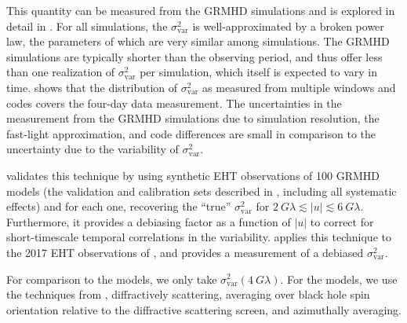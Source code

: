 This quantity can be measured from the GRMHD simulations and is explored in detail in \citealt{Georgiev_2022}. For all simulations, the $\sigma_\text{var}^2$ is well-approximated by a broken power law, the parameters of which are very similar among simulations. The GRMHD simulations are typically shorter than the observing period, and thus offer less than one realization of $\sigma_\text{var}^2$ per simulation, which itself is expected to vary in time. \citealt{Georgiev_2022} shows that the distribution of $\sigma_\text{var}^2$ as measured from multiple windows and codes covers the four-day data measurement. 
The uncertainties in the measurement from the GRMHD simulations due to simulation resolution, the fast-light approximation, and code differences are small in comparison to the uncertainty due to the variability of $\sigma_\text{var}^2$.



\citealt{NoiseModeling} validates this technique by using synthetic EHT observations of 100 GRMHD models (the validation and calibration sets described in , including all systematic effects) and for each one, recovering the ``true'' $\sigma_\text{var}^2$ for $2\ G\lambda\lesssim |u| \lesssim 6\ G\lambda$. Furthermore, it provides a debiasing factor as a function of $|u|$ to correct for short-timescale temporal correlations in the variability.  applies this technique to the 2017 EHT observations of \sgra, and provides a measurement of a debiased $\sigma_\text{var}^2$. 

For comparison to the models, we only take $\sigma_\text{var}^2 (4\ G\lambda)$. For the models, we use the techniques from \citealt{Georgiev_2022}, diffractively scattering, averaging over black hole spin orientation relative to the diffractive scattering screen, and azimuthally averaging. 


